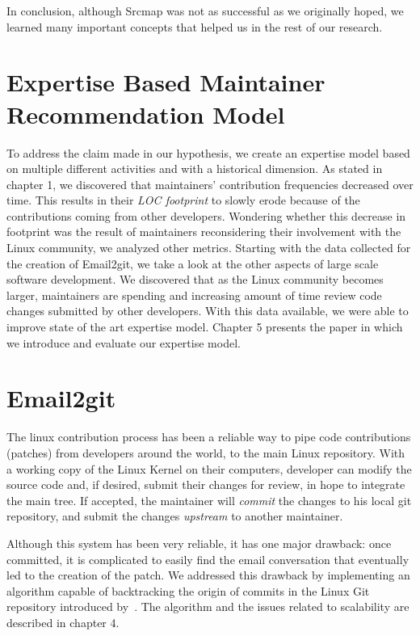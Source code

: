 In conclusion, although Srcmap was not as successful as we originally hoped, we learned many important concepts that helped us in the rest of our research. 


\section{Expertise Based Maintainer Recommendation Model}
\label{sec:expertise_model}

To address the claim made in our hypothesis, we create an expertise model based on multiple different activities and with a historical dimension. As stated in chapter 1, we discovered that maintainers' contribution frequencies decreased over time. This results in their \textit{LOC footprint} to slowly erode because of the contributions coming from other developers. Wondering whether this decrease in footprint was the result of maintainers reconsidering their involvement with the Linux community, we analyzed other metrics. Starting with the data collected for the creation of Email2git, we take a look at the other aspects of large scale software development. We discovered that as the Linux community becomes larger, maintainers are spending and increasing amount of time review code changes submitted by other developers. With this data available, we were able to improve state of the art expertise model. Chapter 5 presents the paper in which we introduce and evaluate our expertise model. 






\section{Email2git}
\label{sec:email2git}

The linux contribution process has been a reliable way to pipe code contributions (patches) from developers around the world, to the main Linux repository. With a working copy of the Linux Kernel on their computers, developer can modify the source code and, if desired, submit their changes for review, in hope to integrate the main tree. If accepted, the maintainer will \textit{commit} the changes to his local git repository, and submit the changes \textit{upstream} to another maintainer. 

Although this system has been very reliable, it has one major drawback: once committed, it is complicated to easily find the email conversation that eventually led to the creation of the patch. We addressed this drawback by implementing an algorithm capable of backtracking the origin of commits in the Linux Git repository introduced by~\citep{jiang14}. The algorithm and the issues related to scalability are described in chapter 4.


